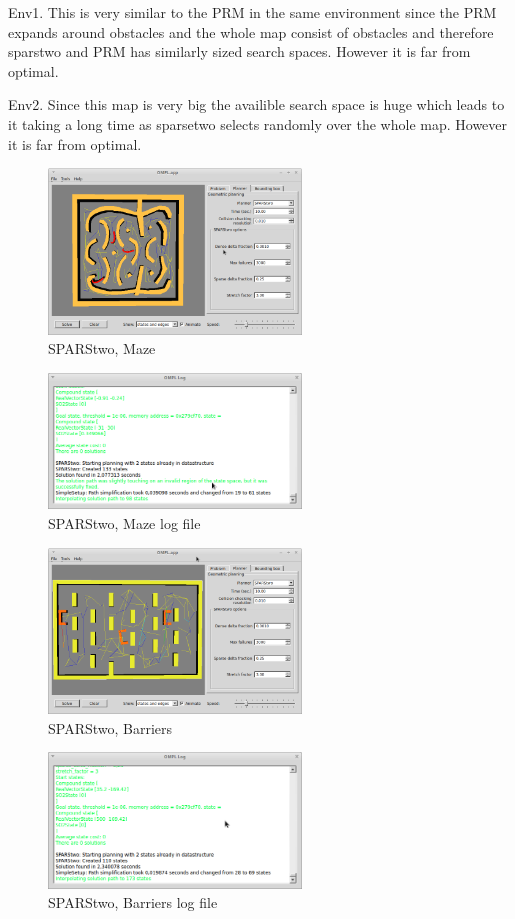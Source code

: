 \documentclass[a4paper]{article}
\begin{document}
Env1.
This is very similar to the PRM in the same environment since the PRM expands around obstacles and the whole map consist of obstacles and therefore sparstwo and PRM has similarly sized search spaces. However it is far from optimal.

Env2.
Since this map is very big the availible search space is huge which leads to it taking a long time as sparsetwo selects randomly over the whole map. However it is far from optimal.

\begin{figure}[H]
     \centering
     \includegraphics[width=0.6\textwidth]{sparsetwo_maze.png}
     \caption{SPARStwo, Maze}
     \label{signals}
\end{figure}

\begin{figure}[H]
     \centering
     \includegraphics[width=0.6\textwidth]{sparsetwo_maze_log.png}
     \caption{SPARStwo, Maze log file}
     \label{signals}
\end{figure}

\begin{figure}[H]
     \centering
     \includegraphics[width=0.6\textwidth]{sparstwo_barrier.png}
     \caption{SPARStwo, Barriers}
     \label{signals}
\end{figure}

\begin{figure}[H]
     \centering
     \includegraphics[width=0.6\textwidth]{sparsetwo_barrier_log.png}
     \caption{SPARStwo, Barriers log file}
     \label{signals}
\end{figure}
\end{document}
